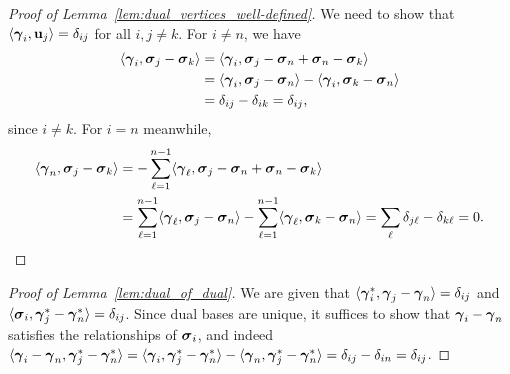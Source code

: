 \begin{proof}[Proof of Lemma~\ref{lem:dual_vertices_well-defined}]
	We need to show that $\langle \vb*{\gamma}_i,\vb{u}_j\rangle = \delta_{ij}$ for all $i,j\neq k$. For $i\neq n$, we have 
	\begin{align*}
	\langle \vb*{\gamma}_i, \vb*{\sigma}_j-\vb*{\sigma}_k\rangle &= \langle \vb*{\gamma}_i,\vb*{\sigma}_j-\vb*{\sigma}_n+\vb*{\sigma}_n-\vb*{\sigma}_k\rangle \\
	&= \langle \vb*{\gamma}_i,\vb*{\sigma}_j-\vb*{\sigma}_n \rangle - \langle \vb*{\gamma}_i,\vb*{\sigma}_k-\vb*{\sigma}_n\rangle \\
	&= \delta_{ij} - \delta_{ik} = \delta_{ij},
	\end{align*}
	since $i\neq k$. For $i=n$ meanwhile, 
	\begin{align*}
	\langle \vb*{\gamma}_n,\vb*{\sigma}_j-\vb*{\sigma}_k\rangle &= -\sum_{\ell=1}^{n-1}\langle \vb*{\gamma}_\ell,\vb*{\sigma}_j-\vb*{\sigma}_n+\vb*{\sigma}_n-\vb*{\sigma}_k\rangle \\
	&= \sum_{\ell=1}^{n-1}\langle \vb*{\gamma}_\ell,\vb*{\sigma}_j-\vb*{\sigma}_n\rangle - \sum_{\ell=1}^{n-1}\langle  \vb*{\gamma}_\ell,\vb*{\sigma}_k-\vb*{\sigma}_n\rangle =\sum_{\ell}\delta_{j\ell}-\delta_{k\ell}=0. \qedhere
	\end{align*}
\end{proof}


\begin{proof}[Proof of Lemma~\ref{lem:dual_of_dual}]
	We are given that $\langle \vb*{\gamma}_i^*,\vb*{\gamma}_j-\vb*{\gamma}_n\rangle=\delta_{ij}$ and $\langle \vb*{\sigma}_i,\vb*{\gamma}_j^*-\vb*{\gamma}_n^*\rangle=\delta_{ij}$. Since dual bases are unique, it suffices to show that $\vb*{\gamma}_i-\vb*{\gamma}_n$ satisfies the relationships of $\vb*{\sigma}_i$, and indeed $\langle \vb*{\gamma}_i-\vb*{\gamma}_n,\vb*{\gamma}_j^*-\vb*{\gamma}_n^*\rangle = \langle \vb*{\gamma}_i,\vb*{\gamma}_j^*-\vb*{\gamma}_n^*\rangle - \langle \vb*{\gamma}_n,\vb*{\gamma}_j^*-\vb*{\gamma}_n^*\rangle = \delta_{ij} - \delta_{in} = \delta_{ij}$. 
\end{proof} 

